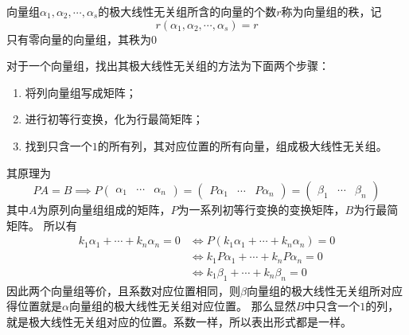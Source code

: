 \begin{definition}
    向量组$\alpha_1,\alpha_2,\cdots,\alpha_s$的极大线性无关组所含的向量的个数$r$称为向量组的秩，记
    \[ r(\alpha_1,\alpha_2,\cdots,\alpha_s) = r \]
    只有零向量的向量组，其秩为$0$
\end{definition}
对于一个向量组，找出其极大线性无关组的方法为下面两个步骤：
\begin{enumerate}
    \item 将列向量组写成矩阵；
    \item 进行初等行变换，化为行最简矩阵；
    \item 找到只含一个$1$的所有列，其对应位置的所有向量，组成极大线性无关组。
\end{enumerate}
其原理为
\[
    PA = B
    \implies P
    \begin{pmatrix}
        \alpha_1 & \cdots & \alpha_n
    \end{pmatrix}
    =
    \begin{pmatrix}
        P\alpha_1 & \cdots & P\alpha_n
    \end{pmatrix}
    =
    \begin{pmatrix}
        \beta_1 & \cdots & \beta_n
    \end{pmatrix}
\]
其中$A$为原列向量组组成的矩阵，$P$为一系列初等行变换的变换矩阵，$B$为行最简矩阵。
所以有
\begin{align*}
    k_1\alpha_1 + \cdots + k_n\alpha_n = 0
     & \iff P(k_1\alpha_1 + \cdots + k_n\alpha_n) = 0 \\
     & \iff k_1P\alpha_1 + \cdots + k_nP\alpha_n = 0  \\
     & \iff k_1\beta_1 + \cdots + k_n\beta_n = 0
\end{align*}
因此两个向量组等价，且系数对应位置相同，则$\beta$向量组的极大线性无关组所对应得位置就是$\alpha$向量组的极大线性无关组对应位置。
那么显然$B$中只含一个$1$的列，就是极大线性无关组对应的位置。系数一样，所以表出形式都是一样。

